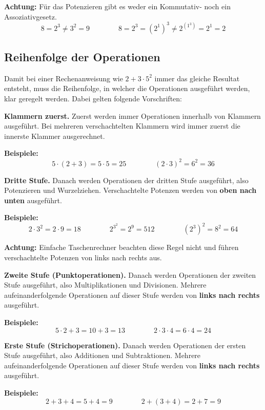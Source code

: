 \begin{note}
  \textbf{Achtung:} Für das Potenzieren gibt es weder ein Kommutativ- noch ein Assoziativgesetz.
  \[
    8 = 2^{3} \ne 3^{2} = 9 \qquad\qquad 8 = 2^{3} = \left(2^{1}\right)^{3} \ne 2^{(1^{3})} = 2^{1} = 2
  \]
\end{note}

\newpage
\subsection{Reihenfolge der Operationen}

Damit bei einer Rechenanweisung wie $2+3\cdot 5^{2}$ immer das gleiche Resultat entsteht, muss die Reihenfolge, in welcher die Operationen ausgeführt werden, klar geregelt werden. Dabei gelten folgende Vorschriften:

\textbf{Klammern zuerst.} Zuerst werden immer Operationen innerhalb von Klammern ausgeführt. Bei mehreren verschachtelten Klammern wird immer zuerst die innerste Klammer ausgerechnet.

\begin{example}
  \textbf{Beispiele:}
  \[
    5\cdot (2+3) = 5\cdot 5 = 25 \qquad\qquad (2\cdot 3)^{2} = 6^{2} = 36
  \]
\end{example}

\textbf{Dritte Stufe.} Danach werden Operationen der dritten Stufe ausgeführt, also Potenzieren und Wurzelziehen. Verschachtelte Potenzen werden von \textbf{oben nach unten} ausgeführt.

\begin{example}
  \textbf{Beispiele:}
  \[
    2\cdot 3^{2} = 2\cdot 9 = 18 \qquad\qquad 2^{3^{2}} = 2^{9} = 512 \qquad\qquad \left(2^{3}\right)^{2} = 8^{2} = 64
  \]
\end{example}

\begin{note}
  \textbf{Achtung:} Einfache Taschenrechner beachten diese Regel nicht und führen verschachtelte Potenzen von links nach rechts aus.
\end{note}

\textbf{Zweite Stufe (Punktoperationen).} Danach werden Operationen der zweiten Stufe ausgeführt, also Multiplikationen und Divisionen. Mehrere aufeinanderfolgende Operationen auf dieser Stufe werden von \textbf{links nach rechts} ausgeführt.

\begin{example}
  \textbf{Beispiele:}
  \[
    5\cdot 2+3 = 10+3 = 13 \qquad\qquad 2\cdot 3\cdot 4 = 6\cdot 4 = 24
  \]
\end{example}

\textbf{Erste Stufe (Strichoperationen).} Danach werden Operationen der ersten Stufe ausgeführt, also Additionen und Subtraktionen. Mehrere aufeinanderfolgende Operationen auf dieser Stufe werden von \textbf{links nach rechts} ausgeführt.

\begin{example}
  \textbf{Beispiele:}
  \[
    2+3+4 = 5+4 = 9 \qquad\qquad 2+(3+4) = 2+7 = 9
  \]
\end{example}
